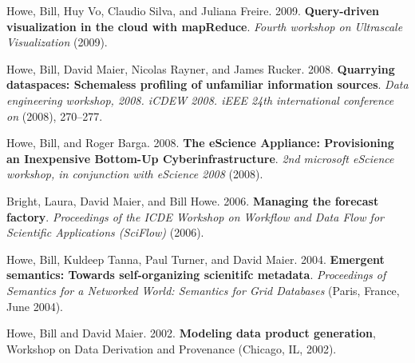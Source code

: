 \begin{bulletlist}
\item Howe, Bill, Huy Vo, Claudio Silva, and Juliana
Freire. 2009. \textbf{Query-driven visualization in the cloud with mapReduce}.
\emph{Fourth workshop on Ultrascale Visualization} (2009). 

\item Howe, Bill, David Maier, Nicolas Rayner, and James
Rucker. 2008. \textbf{Quarrying dataspaces: Schemaless profiling of unfamiliar
information sources}. \emph{Data engineering workshop, 2008. iCDEW 2008.
iEEE 24th international conference on} (2008), 270--277. 

\item Howe, Bill, and Roger Barga.
2008. \textbf{The eScience Appliance: Provisioning an Inexpensive Bottom-Up
Cyberinfrastructure}. \emph{2nd microsoft eScience workshop, in
conjunction with eScience 2008} (2008). 

\item Bright, Laura, David Maier, and Bill Howe. 2006. \textbf{Managing the
forecast factory}. \emph{Proceedings of the ICDE Workshop on Workflow and
Data Flow for Scientific Applications (SciFlow)} (2006). 

\item Howe, Bill, Kuldeep Tanna, Paul Turner, and David Maier. 2004.
\textbf{Emergent semantics: Towards self-organizing scienitifc metadata}.
\emph{Proceedings of Semantics for a Networked World: Semantics for Grid
Databases} (Paris, France, June 2004). 

\item Howe, Bill and David Maier. 2002. \textbf{Modeling data product generation},
Workshop on Data Derivation and Provenance (Chicago, IL, 2002).
\end{bulletlist}

